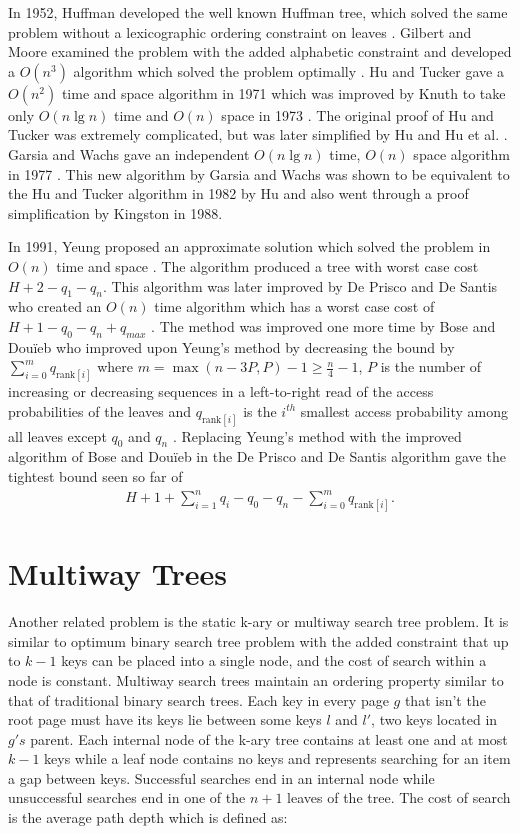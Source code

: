 \documentclass[letterpaper,12pt,titlepage,oneside,final]{book}
\theoremstyle{plain}
\begin{document}
In 1952, Huffman developed the well known Huffman tree, which solved the same problem without a lexicographic ordering constraint on leaves \cite{huffman1952method}. Gilbert and Moore examined the problem with the added alphabetic constraint and developed a $O(n^3)$ algorithm which solved the problem optimally \cite{gilbert1959variable}. Hu and Tucker gave a $O(n^2)$ time and space algorithm in 1971 \cite{hu1971optimal} which was improved by Knuth to take only $O(n \lg n)$ time and $O(n)$ space in 1973 \cite{knuth1973sorting}. The original proof of Hu and Tucker was extremely complicated, but was later simplified by Hu \cite{hu1973new} and Hu et al. \cite{hu1979binary}. Garsia and Wachs gave an independent $O(n \lg n)$ time, $O(n)$ space algorithm in 1977 \cite{garsia1977new}. This new algorithm by Garsia and Wachs was shown to be equivalent to the Hu and Tucker algorithm in 1982 by Hu \cite{Hu1982Book} and also went through a proof simplification \cite{kingston1988new} by Kingston in 1988.

In 1991, Yeung proposed an approximate solution which solved the problem in $O(n)$ time and space \cite{yeung1991alphabetic}. The algorithm produced a tree with worst case cost $H + 2 - q_1-q_n$. This algorithm was later improved by De Prisco and De Santis who created an $O(n)$ time algorithm which has a worst case cost of $H+1-q_0-q_n+q_{max}$ \cite{de1993binary}. The method was improved one more time by Bose and Dou\"{i}eb who improved upon Yeung's method by decreasing the bound by $\sum_{i=0}^m q_{\text{rank}[i]}$ where $m=\max({n-3P,P})-1 \geq \frac{n}{4} - 1$, $P$ is the number of increasing or decreasing sequences in a left-to-right read of the access probabilities of the leaves and $q_{\text{rank}[i]}$ is the $i^{th}$ smallest access probability among all leaves except $q_0$ and $q_n$ \cite{bose2009efficient}. Replacing Yeung's method with the improved algorithm of Bose and Dou\"{i}eb in the De Prisco and De Santis algorithm gave the tightest bound seen so far of 
\begin{align*}
H+1+\sum_{i=1}^{n}q_i-q_0-q_n-\sum_{i=0}^m q_{\text{rank}[i]}. 
\end{align*}

\section{Multiway Trees} \label{sec:MWT}


Another related problem is the static k-ary or multiway search tree problem. It is similar to optimum binary search tree problem with the added constraint that up to $k-1$ keys can be placed into a single node, and the cost of search within a node is constant. Multiway search trees maintain an ordering property similar to that of traditional binary search trees. Each key in every page $g$ that isn't the root page must have its keys lie between some keys $l$ and $l'$, two keys located in $g's$ parent. Each internal node of the k-ary tree contains at least one and at most $k-1$ keys while a leaf node contains no keys and represents searching for an item a gap between keys. Successful searches end in an internal node while unsuccessful searches end in one of the $n+1$ leaves of the tree. The cost of search is the average path depth which is defined as:
\end{document}
